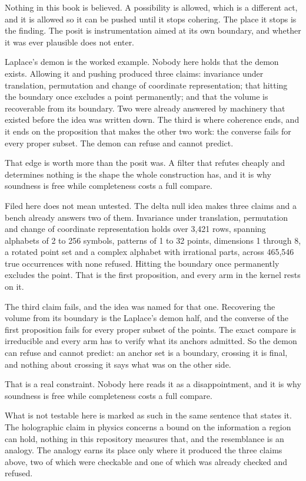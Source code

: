 Nothing in this book is believed. A possibility is allowed, which is a different act, and it is
allowed so it can be pushed until it stops cohering. The place it stops is the finding. The posit
is instrumentation aimed at its own boundary, and whether it was ever plausible does not enter.

Laplace's demon is the worked example. Nobody here holds that the demon exists. Allowing it and
pushing produced three claims: invariance under translation, permutation and change of coordinate
representation; that hitting the boundary once excludes a point permanently; and that the volume is
recoverable from its boundary. Two were already answered by machinery that existed before the idea
was written down. The third is where coherence ends, and it ends on the proposition that makes the
other two work: the converse fails for every proper subset. The demon can refuse and cannot
predict.

That edge is worth more than the posit was. A filter that refutes cheaply and determines nothing is
the shape the whole construction has, and it is why soundness is free while completeness costs a
full compare.

Filed here does not mean untested. The delta null idea makes three claims and a bench already
answers two of them. Invariance under translation, permutation and change of coordinate
representation holds over 3,421 rows, spanning alphabets of 2 to 256 symbols, patterns of 1 to 32
points, dimensions 1 through 8, a rotated point set and a complex alphabet with irrational parts,
across 465,546 true occurrences with none refused. Hitting the boundary once permanently excludes the
point. That is the first proposition, and every arm in the kernel rests on it.

The third claim fails, and the idea was named for that one. Recovering the volume from its
boundary is the Laplace's demon half, and the converse of the first proposition fails for every
proper subset of the points. The exact compare is irreducible and every arm has to verify what its
anchors admitted. So the demon can refuse and cannot predict: an anchor set is a boundary, crossing
it is final, and nothing about crossing it says what was on the other side.

That is a real constraint. Nobody here reads it as a disappointment, and it is why soundness is
free while completeness costs a full compare.

What is not testable here is marked as such in the same sentence that states it. The holographic
claim in physics concerns a bound on the information a region can hold, nothing in this repository
measures that, and the resemblance is an analogy. The analogy earns its place only where it produced
the three claims above, two of which were checkable and one of which was already checked and refused.
\cleardoublepage
